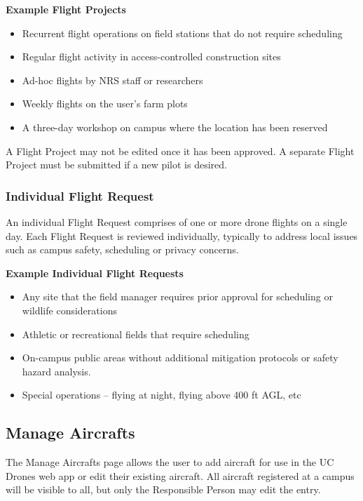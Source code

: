 \documentclass[
  12pt,
]{book}
\providecommand{\tightlist}{%
  \setlength{\itemsep}{0pt}\setlength{\parskip}{0pt}}
\begin{document}
\textbf{Example Flight Projects}

\begin{itemize}
\tightlist
\item
  Recurrent flight operations on field stations that do not require scheduling
\item
  Regular flight activity in access-controlled construction sites
\item
  Ad-hoc flights by NRS staff or researchers
\item
  Weekly flights on the user's farm plots
\item
  A three-day workshop on campus where the location has been reserved
\end{itemize}

A Flight Project may not be edited once it has been approved. A separate Flight Project must be submitted if a new pilot is desired.

\subsubsection{Individual Flight Request}\label{individual-flight-request}

An individual Flight Request comprises of one or more drone flights on a single day. Each Flight Request is reviewed individually, typically to address local issues such as campus safety, scheduling or privacy concerns.

\textbf{Example Individual Flight Requests}

\begin{itemize}
\tightlist
\item
  Any site that the field manager requires prior approval for scheduling or wildlife considerations
\item
  Athletic or recreational fields that require scheduling
\item
  On-campus public areas without additional mitigation protocols or safety hazard analysis.
\item
  Special operations -- flying at night, flying above 400 ft AGL, etc
\end{itemize}

\subsection{Manage Aircrafts}\label{manage-aircrafts}

The Manage Aircrafts page allows the user to add aircraft for use in the UC Drones web app or edit their existing aircraft. All aircraft registered at a campus will be visible to all, but only the Responsible Person may edit the entry.
\end{document}
